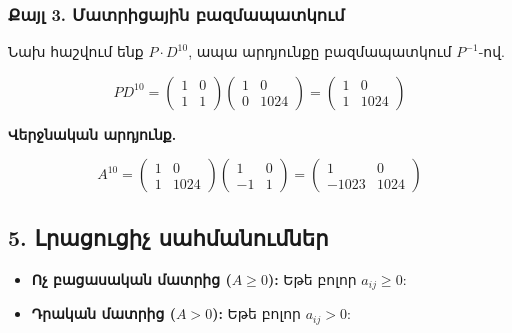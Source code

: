 \documentclass[12pt, a4paper]{article}
\begin{document}
\subsubsection{Քայլ 3. Մատրիցային բազմապատկում}

Նախ հաշվում ենք $P \cdot D^{10}$, ապա արդյունքը բազմապատկում $P^{-1}$-ով.

$$
P D^{10} = \begin{pmatrix} 1 & 0 \\ 1 & 1 \end{pmatrix} \begin{pmatrix} 1 & 0 \\ 0 & 1024 \end{pmatrix} = \begin{pmatrix} 1 & 0 \\ 1 & 1024 \end{pmatrix}
$$

\textbf{Վերջնական արդյունք.}

$$
A^{10} = \begin{pmatrix} 1 & 0 \\ 1 & 1024 \end{pmatrix} \begin{pmatrix} 1 & 0 \\ -1 & 1 \end{pmatrix} = \begin{pmatrix} 1 & 0 \\ -1023 & 1024 \end{pmatrix}
$$

\subsection{5. Լրացուցիչ սահմանումներ}

\begin{itemize}
    \item \textbf{Ոչ բացասական մատրից ($A \ge 0$):} Եթե բոլոր $a_{ij} \ge 0$:
    \item \textbf{Դրական մատրից ($A > 0$):} Եթե բոլոր $a_{ij} > 0$:
\end{itemize}
\end{document}
